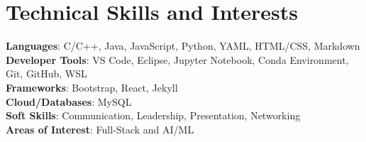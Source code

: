 \documentclass[a4paper,11pt]{article}
\begin{document}
\section{\textbf{Technical Skills and Interests}}
 \begin{itemize}[leftmargin=0.1in, label={}]
    \vspace{0.5mm}
    \small{\item{
     \textbf{Languages}{: C/C++, Java, JavaScript, Python, YAML, HTML/CSS, Markdown} \\
     \vspace{0.5mm}
     \textbf{Developer Tools}{: VS Code, Eclipse, Jupyter Notebook, Conda Environment, Git, GitHub, WSL} \\
     \vspace{0.5mm}
     \textbf{Frameworks}{: Bootstrap, React, Jekyll} \\
     \vspace{0.5mm}
     \textbf{Cloud/Databases}{: MySQL} \\
     \vspace{0.5mm}
     \textbf{Soft Skills}{: Communication, Leadership, Presentation, Networking} \\
     \vspace{0.5mm}
     \textbf{Areas of Interest}{: Full-Stack and AI/ML} \\
    }}
 \end{itemize}
 \vspace{-16pt}




\end{document}
